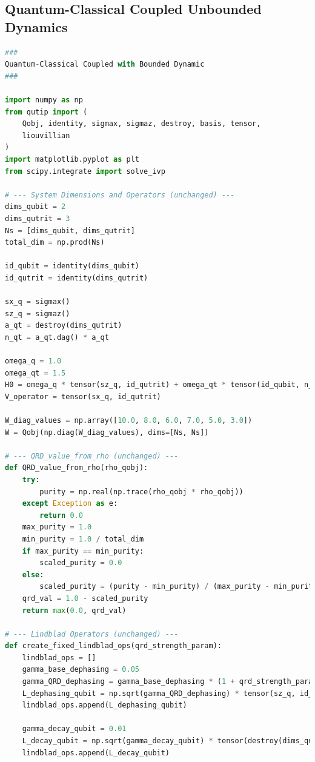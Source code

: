 \documentclass[9pt]{article}
\begin{document}
\subsection{Quantum-Classical Coupled Unbounded Dynamics}
\begin{lstlisting}[language=Python, basicstyle=\ttfamily\footnotesize, breaklines=true, frame=single, caption={Python Code for Quantum-Classical Coupled with bounded Dynamics}, label={lst:qrd_code}]
###
Quantum-Classical Coupled with Bounded Dynamic
###

import numpy as np
from qutip import (
    Qobj, identity, sigmax, sigmaz, destroy, basis, tensor,
    liouvillian
)
import matplotlib.pyplot as plt
from scipy.integrate import solve_ivp

# --- System Dimensions and Operators (unchanged) ---
dims_qubit = 2
dims_qutrit = 3
Ns = [dims_qubit, dims_qutrit]
total_dim = np.prod(Ns)

id_qubit = identity(dims_qubit)
id_qutrit = identity(dims_qutrit)

sx_q = sigmax()
sz_q = sigmaz()
a_qt = destroy(dims_qutrit)
n_qt = a_qt.dag() * a_qt

omega_q = 1.0
omega_qt = 1.5
H0 = omega_q * tensor(sz_q, id_qutrit) + omega_qt * tensor(id_qubit, n_qt)
V_operator = tensor(sx_q, id_qutrit) 

W_diag_values = np.array([10.0, 8.0, 6.0, 7.0, 5.0, 3.0])
W = Qobj(np.diag(W_diag_values), dims=[Ns, Ns])

# --- QRD_value_from_rho (unchanged) ---
def QRD_value_from_rho(rho_qobj):
    try:
        purity = np.real(np.trace(rho_qobj * rho_qobj))
    except Exception as e:
        return 0.0
    max_purity = 1.0
    min_purity = 1.0 / total_dim
    if max_purity == min_purity:
        scaled_purity = 0.0
    else:
        scaled_purity = (purity - min_purity) / (max_purity - min_purity)
    qrd_val = 1.0 - scaled_purity
    return max(0.0, qrd_val)

# --- Lindblad Operators (unchanged) ---
def create_fixed_lindblad_ops(qrd_strength_param):
    lindblad_ops = []
    gamma_base_dephasing = 0.05
    gamma_QRD_dephasing = gamma_base_dephasing * (1 + qrd_strength_param * 2.0)
    L_dephasing_qubit = np.sqrt(gamma_QRD_dephasing) * tensor(sz_q, id_qutrit)
    lindblad_ops.append(L_dephasing_qubit)

    gamma_decay_qubit = 0.01
    L_decay_qubit = np.sqrt(gamma_decay_qubit) * tensor(destroy(dims_qubit), id_qutrit)
    lindblad_ops.append(L_decay_qubit)


\end{lstlisting}
\end{document}
